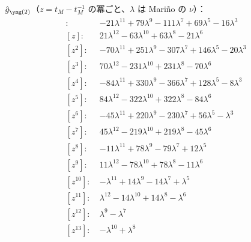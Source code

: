 $\hat g_{\ytwo}$（$z = t_M - t_M^{-1}$ の冪ごと、$\lambda$ は Mariño の $\nu$）：
\begin{align*}
[z^{0}]\colon\ & -21 \lambda^{11} +79 \lambda^{9} -111 \lambda^{7} +69 \lambda^{5} -16 \lambda^{3} \\
[z]\colon\ & 21 \lambda^{12} -63 \lambda^{10} +63 \lambda^{8} -21 \lambda^{6} \\
[z^{2}]\colon\ & -70 \lambda^{11} +251 \lambda^{9} -307 \lambda^{7} +146 \lambda^{5} -20 \lambda^{3} \\
[z^{3}]\colon\ & 70 \lambda^{12} -231 \lambda^{10} +231 \lambda^{8} -70 \lambda^{6} \\
[z^{4}]\colon\ & -84 \lambda^{11} +330 \lambda^{9} -366 \lambda^{7} +128 \lambda^{5} -8 \lambda^{3} \\
[z^{5}]\colon\ & 84 \lambda^{12} -322 \lambda^{10} +322 \lambda^{8} -84 \lambda^{6} \\
[z^{6}]\colon\ & -45 \lambda^{11} +220 \lambda^{9} -230 \lambda^{7} +56 \lambda^{5} -\lambda^{3} \\
[z^{7}]\colon\ & 45 \lambda^{12} -219 \lambda^{10} +219 \lambda^{8} -45 \lambda^{6} \\
[z^{8}]\colon\ & -11 \lambda^{11} +78 \lambda^{9} -79 \lambda^{7} +12 \lambda^{5} \\
[z^{9}]\colon\ & 11 \lambda^{12} -78 \lambda^{10} +78 \lambda^{8} -11 \lambda^{6} \\
[z^{10}]\colon\ & -\lambda^{11} +14 \lambda^{9} -14 \lambda^{7} +\lambda^{5} \\
[z^{11}]\colon\ & \lambda^{12} -14 \lambda^{10} +14 \lambda^{8} -\lambda^{6} \\
[z^{12}]\colon\ & \lambda^{9} -\lambda^{7} \\
[z^{13}]\colon\ & -\lambda^{10} +\lambda^{8}
\end{align*}

